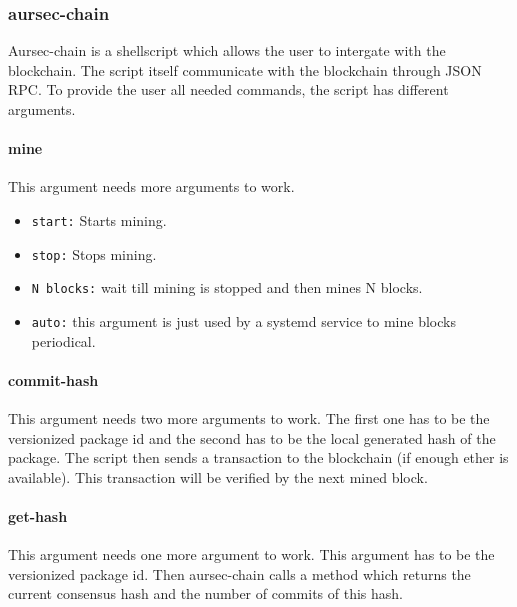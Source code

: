  \subsubsection{aursec-chain}\label{sec:aursec-chain}
Aursec-chain is a shellscript which allows the user to intergate with the blockchain. The script itself communicate with the blockchain through JSON RPC. To provide the user all needed commands, the script has different arguments.

\paragraph*{mine}
This argument needs more arguments to work.
\begin{itemize}
	\item \texttt{start:} Starts mining.
	\item \texttt{stop:} Stops mining.
	\item \texttt{N blocks:} wait till mining is stopped and then mines N blocks.
	\item \texttt{auto:} this argument is just used by a systemd service to mine blocks periodical.
\end{itemize}

\paragraph*{commit-hash}
This argument needs two more arguments to work. The first one has to be the versionized package id and the second has to be the local generated hash of the package. The script then sends a transaction to the blockchain (if enough ether is available). This transaction will be verified by the next mined block.

\paragraph*{get-hash}
This argument needs one more argument to work. This argument has to be the versionized package id. Then aursec-chain calls a method which returns the current consensus hash and the number of commits of this hash. 
